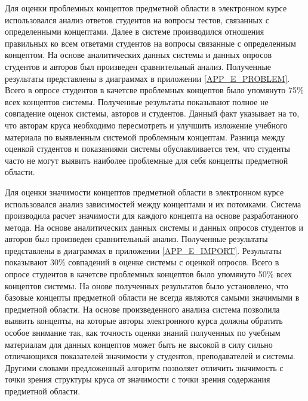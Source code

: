 Для оценки проблемных концептов предметной области в электронном курсе использовался анализ ответов студентов на вопросы тестов, связанных с определенными концептами. Далее в системе производился отношения правильных ко всем ответами студентов на вопросы связанные с определенным концептом. На основе аналитических данных системы и данных опросов студентов и авторов был произведен сравнительный анализ. Полученные результаты представлены в диаграммах в приложении \ref{APP_E_PROBLEM}. Всего в опросе студентов в качетсве проблемных концептов было упомянуто 75\% всех концептов системы. Полученные результаты показывают полное не совпадение оценок системы, авторов и студентов. Данный факт указывает на то, что авторам круса необходимо пересмотреть и улучшить изложение учебного материала по выявленным системой проблемным концептам. Разница между оценкой студентов и показаниями системы обуславливается тем, что студенты часто не могут выявить наиболее проблемные для себя концепты предметной области.

Для оценки значимости концептов предметной области в электронном курсе использовался анализ зависимостей между концептами и их потомками. Система производила расчет значимости для каждого концепта на основе разработанного метода. На основе аналитических данных системы и данных опросов студентов и авторов был произведен сравнительный анализ. Полученные результаты представлены в диаграммах в приложении \ref{APP_E_IMPORT}. Результаты показывают 30\% совпадений в оценке системы с оценкой опросов. Всего в опросе студентов в качетсве проблемных концептов было упомянуто 50\% всех концептов системы. На онове полученных результатов было установлено, что базовые концепты предметной области не всегда являются самыми значимыми в предметной области. На основе произведенного анализа система позволила выявить концепты, на которые авторы электронного курса должны обратить особое внимание так, как точность оценки знаний полученных по учебным материалам для данных концептов может быть не высокой в силу сильно отличающихся показателей значимости у студентов, преподавателей и системы. Другими словами предложенный алгоритм позволяет отличить значимость с точки зрения структуры круса от значимости с точки зрения содержания предметной области.

